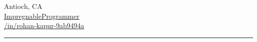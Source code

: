 \documentclass[letterpaper,10pt]{article}
\begin{document}
\begin{multicols}{3}
\begin{flushright}
    \vspace{1em}
    \faLocationArrow\hspace{4px}Antioch, CA \\
    \vspace{1em}
    \faGithub\hspace{4px}\href{https://github.com/ImpregnableProgrammer}{ImpregnableProgrammer} \\
    \vspace{1em}
    \faLinkedin\hspace{4px}\href{https://www.linkedin.com/in/rohan-kapur-9ab9494a}{/in/rohan-kapur-9ab9494a}
  \end{flushright}
\end{multicols}
{\color{magenta}\hrule}
\vspace{.5em}
\end{document}
